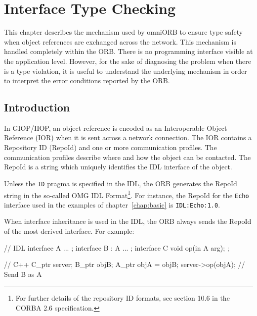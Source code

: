\documentclass[11pt,twoside,a4paper]{book}
\newcommand{\intf}[1]{\texttt{#1}}
\newcommand{\code}[1]{\texttt{#1}}
\begin{document}
\chapter{Interface Type Checking}
\label{ch_intf}

This chapter describes the mechanism used by omniORB to ensure type
safety when object references are exchanged across the network. This
mechanism is handled completely within the ORB. There is no
programming interface visible at the application level. However, for
the sake of diagnosing the problem when there is a type violation, it
is useful to understand the underlying mechanism in order to interpret
the error conditions reported by the ORB.

\section{Introduction}

In GIOP/IIOP, an object reference is encoded as an Interoperable
Object Reference (IOR) when it is sent across a network connection.
The IOR contains a Repository ID (RepoId) and one or more
communication profiles. The communication profiles describe where and
how the object can be contacted. The RepoId is a string which uniquely
identifies the IDL interface of the object.

Unless the \code{ID} pragma is specified in the IDL, the ORB generates
the RepoId string in the so-called OMG IDL Format\footnote{For further
details of the repository ID formats, see section 10.6 in the CORBA
2.6 specification.}. For instance, the RepoId for the \intf{Echo}
interface used in the examples of chapter~\ref{chap:basic} is
\texttt{IDL:Echo:1.0}.

When interface inheritance is used in the IDL, the ORB always sends the
RepoId of the most derived interface. For example:

\begin{idllisting}
   // IDL
   interface A {
     ...
   };
   interface B : A {
     ...
   };
   interface C {
      void op(in A arg);
   };
\end{idllisting}

\begin{cxxlisting}
   // C++
   C_ptr server;
   B_ptr objB;
   A_ptr objA = objB;
   server->op(objA);  // Send B as A
\end{cxxlisting}
\end{document}

